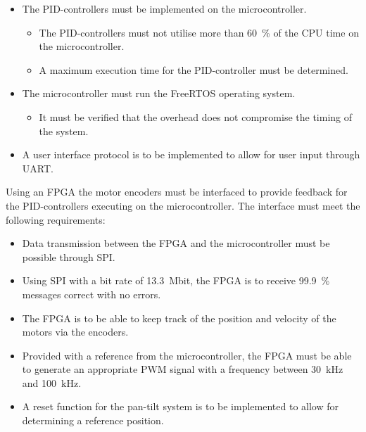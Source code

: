 \documentclass[../../main.tex]{subfiles}
\begin{document}
\begin{itemize}
    \item The PID-controllers must be implemented on the microcontroller.
    \begin{itemize}
        \item The PID-controllers must not utilise more than \SI{60}{\percent} of the CPU time on the microcontroller.
        \item A maximum execution time for the PID-controller must be determined.
    \end{itemize}
    \item The microcontroller must run the FreeRTOS operating system.
    \begin{itemize}
        \item It must be verified that the overhead does not compromise the timing of the system.
    \end{itemize}
    
    \item A user interface protocol is to be implemented to allow for user input through UART.
\end{itemize}
Using an FPGA the motor encoders must be interfaced to provide feedback for the PID-controllers executing on the microcontroller. The interface must meet the following requirements:
\begin{itemize}
    \item Data transmission between the FPGA and the microcontroller must be possible through SPI.
    \item Using SPI with a bit rate of \SI{13,3}{\mega bit}, the FPGA is to receive \SI{99,9}{\percent} messages correct with no errors.
    \item The FPGA is to be able to keep track of the position and velocity of the motors via the encoders.
    \item Provided with a reference from the microcontroller, the FPGA must be able to generate an appropriate PWM signal with a frequency between \SI{30}{\kilo\hertz} and \SI{100}{\kilo\hertz}.
    \item A reset function for the pan-tilt system is to be implemented to allow for determining a reference position.
\end{itemize}
\end{document}
